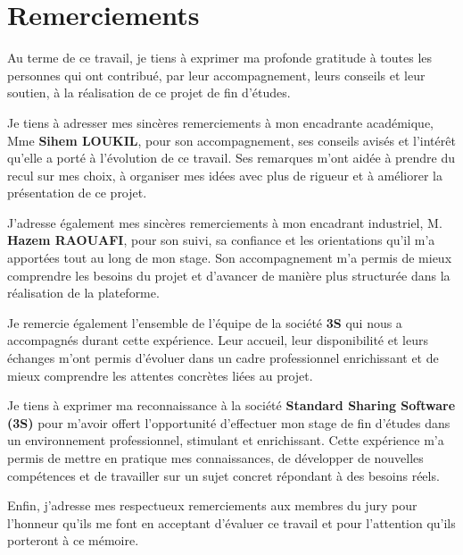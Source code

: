 \clearpage
\chapter*{Remerciements}

\begin{center}
\begin{minipage}{0.9\textwidth}
\centering
\small
{}

Au terme de ce travail, je tiens à exprimer ma profonde gratitude à toutes les personnes qui ont contribué, par leur accompagnement, leurs conseils et leur soutien, à la réalisation de ce projet de fin d'études.

Je tiens à adresser mes sincères remerciements à mon encadrante académique, Mme \textbf{Sihem LOUKIL}, pour son accompagnement, ses conseils avisés et l'intérêt qu'elle a porté à l'évolution de ce travail. Ses remarques m'ont aidée à prendre du recul sur mes choix, à organiser mes idées avec plus de rigueur et à améliorer la présentation de ce projet.

J'adresse également mes sincères remerciements à mon encadrant industriel, M. \textbf{Hazem RAOUAFI}, pour son suivi, sa confiance et les orientations qu'il m'a apportées tout au long de mon stage. Son accompagnement m'a permis de mieux comprendre les besoins du projet et d'avancer de manière plus structurée dans la réalisation de la plateforme.

Je remercie également l'ensemble de l'équipe de la société \textbf{3S} qui nous a accompagnés durant cette expérience. Leur accueil, leur disponibilité et leurs échanges m'ont permis d'évoluer dans un cadre professionnel enrichissant et de mieux comprendre les attentes concrètes liées au projet.

Je tiens à exprimer ma reconnaissance à la société \textbf{Standard Sharing Software (3S)} pour m'avoir offert l'opportunité d'effectuer mon stage de fin d'études dans un environnement professionnel, stimulant et enrichissant. Cette expérience m'a permis de mettre en pratique mes connaissances, de développer de nouvelles compétences et de travailler sur un sujet concret répondant à des besoins réels.

Enfin, j'adresse mes respectueux remerciements aux membres du jury pour l'honneur qu'ils me font en acceptant d'évaluer ce travail et pour l'attention qu'ils porteront à ce mémoire.

\end{minipage}
\end{center}
